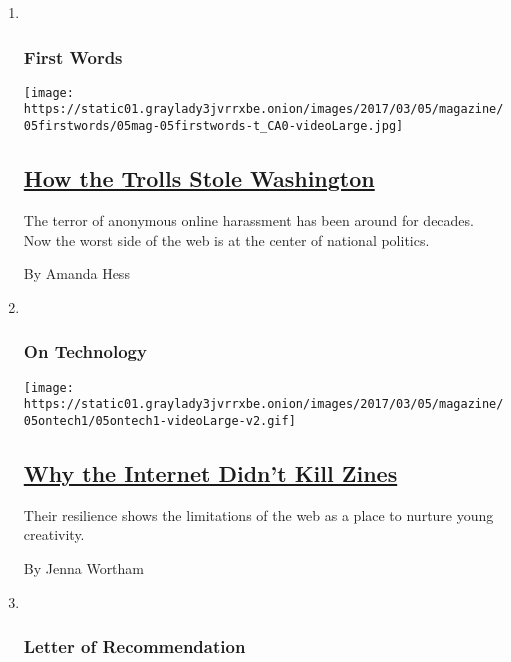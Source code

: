 \begin{enumerate}
\def\labelenumi{\arabic{enumi}.}
\item ~
  \hypertarget{first-words}{%
  \subsubsection{First Words}\label{first-words}}

  \texttt{[image: https://static01.graylady3jvrrxbe.onion/images/2017/03/05/magazine/05firstwords/05mag-05firstwords-t\_CA0-videoLarge.jpg]}

  \hypertarget{how-the-trolls-stole-washington}{%
  \subsection{\texorpdfstring{\href{/2017/02/28/magazine/how-the-trolls-stole-washington.html}{How
  the Trolls Stole
  Washington}}{How the Trolls Stole Washington}}\label{how-the-trolls-stole-washington}}

  The terror of anonymous online harassment has been around for decades.
  Now the worst side of the web is at the center of national politics.

  By Amanda Hess
\item ~
  \hypertarget{on-technology}{%
  \subsubsection{On Technology}\label{on-technology}}

  \texttt{[image: https://static01.graylady3jvrrxbe.onion/images/2017/03/05/magazine/05ontech1/05ontech1-videoLarge-v2.gif]}

  \hypertarget{why-the-internet-didnt-kill-zines}{%
  \subsection{\texorpdfstring{\href{/2017/02/28/magazine/why-the-internet-didnt-kill-zines.html}{Why
  the Internet Didn't Kill
  Zines}}{Why the Internet Didn't Kill Zines}}\label{why-the-internet-didnt-kill-zines}}

  Their resilience shows the limitations of the web as a place to
  nurture young creativity.

  By Jenna Wortham
\item ~
  \hypertarget{letter-of-recommendation}{%
  \subsubsection{Letter of
  Recommendation}\label{letter-of-recommendation}}


\end{enumerate}
